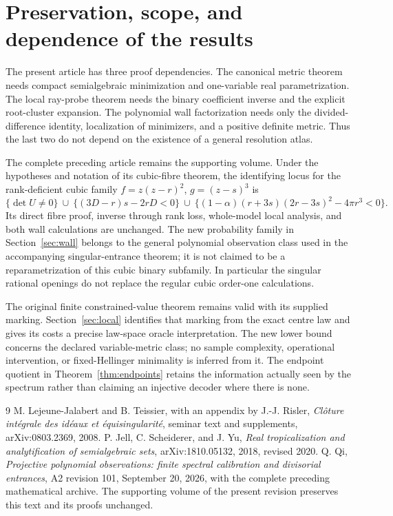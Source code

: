\documentclass[11pt,reqno]{amsart}
\numberwithin{equation}{section}
\theoremstyle{definition}
\theoremstyle{remark}
\begin{document}
\section{Preservation, scope, and dependence of the results}\label{app:scope}
The present article has three proof dependencies. The canonical metric theorem needs compact semialgebraic minimization and one-variable real parametrization. The local ray-probe theorem needs the binary coefficient inverse and the explicit root-cluster expansion. The polynomial wall factorization needs only the divided-difference identity, localization of minimizers, and a positive definite metric. Thus the last two do not depend on the existence of a general resolution atlas.

The complete preceding article remains the supporting volume. Under the hypotheses and notation of its cubic-fibre theorem, the identifying locus for the rank-deficient cubic family $f=z(z-r)^2$, $g=(z-s)^3$ is
\[
 \{\det U\ne0\}\ \cup\ \{(3D-r)s-2rD<0\}\ \cup\
 \{(1-\alpha)(r+3s)(2r-3s)^2-4\pi r^3<0\}.
\]
Its direct fibre proof, inverse through rank loss, whole-model local analysis, and both wall calculations are unchanged. The new probability family in Section~\ref{sec:wall} belongs to the general polynomial observation class used in the accompanying singular-entrance theorem; it is not claimed to be a reparametrization of this cubic binary subfamily. In particular the singular rational openings do not replace the regular cubic order-one calculations.

The original finite constrained-value theorem remains valid with its supplied marking. Section~\ref{sec:local} identifies that marking from the exact centre law and gives its costs a precise law-space oracle interpretation. The new lower bound concerns the declared variable-metric class; no sample complexity, operational intervention, or fixed-Hellinger minimality is inferred from it. The endpoint quotient in Theorem~\ref{thm:endpoints} retains the information actually seen by the spectrum rather than claiming an injective decoder where there is none.

\begin{thebibliography}{9}
 M. Lejeune-Jalabert and B. Teissier, with an appendix by J.-J. Risler,
\emph{Cl\^oture int\'egrale des id\'eaux et \'equisingularit\'e},
seminar text and supplements, arXiv:0803.2369, 2008.
 P. Jell, C. Scheiderer, and J. Yu,
\emph{Real tropicalization and analytification of semialgebraic sets},
arXiv:1810.05132, 2018, revised 2020.
 Q. Qi, \emph{Projective polynomial observations: finite spectral calibration and divisorial entrances},
A2 revision 101, September 20, 2026, with the complete preceding mathematical archive. The supporting volume of the present revision preserves this text and its proofs unchanged.
\end{thebibliography}
\end{document}
